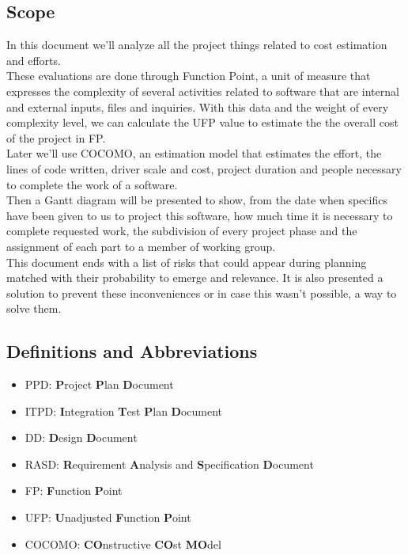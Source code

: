 \subsection{Scope}
In this document we'll analyze all the project things related to cost estimation and efforts.\\
These evaluations are done through Function Point, a unit of measure that expresses the complexity of several activities related to software that are internal and external inputs, files and inquiries. With this data and the weight of every complexity level, we can calculate the UFP value to estimate the the overall cost of the project in FP.\\ 
Later we'll use COCOMO, an estimation model that estimates the effort, the lines of code written, driver scale and cost, project duration and people necessary to complete the work of a software.\\
Then a Gantt diagram will be presented to show, from the date when specifics have been given to us to project this software, how much time it is necessary to complete requested work, the subdivision of every project phase and the assignment of each part to a member of working group.\\
This document ends with a list of risks that could appear during planning matched with their probability to emerge and relevance. It is also presented a solution to prevent these inconveniences or in case this wasn't possible, a way to solve them.
\subsection{Definitions and Abbreviations}
\begin{itemize}
	\item PPD: \textbf{P}roject \textbf{P}lan \textbf{D}ocument
	\item ITPD: \textbf{I}ntegration \textbf{T}est \textbf{P}lan \textbf{D}ocument
	\item DD: \textbf{D}esign \textbf{D}ocument
	\item RASD: \textbf{R}equirement \textbf{A}nalysis and \textbf{S}pecification \textbf{D}ocument
	\item FP: \textbf{F}unction \textbf{P}oint
	\item UFP: \textbf{U}nadjusted \textbf{F}unction \textbf{P}oint
	\item COCOMO: \textbf{CO}nstructive \textbf{CO}st \textbf{MO}del
\end{itemize}
